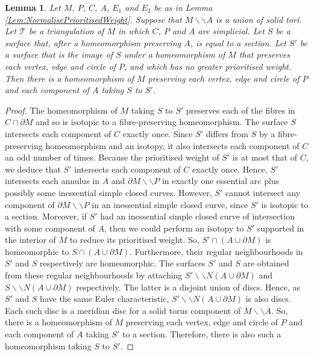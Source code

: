 \documentclass[oneside]{amsart}
\numberwithin{equation}{section}
\theoremstyle{plain}
\newtheorem{lemma}[equation]{Lemma}
\theoremstyle{definition}
\newcommand{\cut}{\backslash\backslash}
\begin{document}
\begin{lemma}
\label{Lem:TwoEquivalences}
Let $M$, $P$, $C$, $A$, $E_1$ and $E_2$ be as in Lemma \ref{Lem:NormalisePrioritisedWeight}.
Suppose that $M \cut A$ is a union of solid tori.
Let $\mathcal{T}$ be a triangulation of $M$ in which $C$, $P$ and $A$ are simplicial. 
Let $S$ be a surface that, after a homeomorphism preserving $A$, is equal to a section.
Let $S'$ be a surface that is the image of $S$ under a homeomorphism of $M$ that preserves
each vertex, edge and circle of $P$, and which has no greater prioritised weight.
Then there is a homeomorphism of $M$ preserving each vertex, edge and circle of $P$ and each component of $A$ taking $S$ to $S'$.
\end{lemma}

\begin{proof}
The homeomorphism of $M$ taking $S$ to $S'$ preserves each of the fibres in $C \cap \partial M$
and so is isotopic to a fibre-preserving homeomorphism.
The surface $S$ intersects each component of $C$ exactly once. Since $S'$ differs from $S$ by a fibre-preserving homeomorphism and an isotopy,
it also intersects each component of $C$ an odd number of times. Because the prioritised weight
of $S'$ is at most that of $C$, we deduce that $S'$ intersects each component of $C$ exactly once.
Hence, $S'$ intersects each annulus in $A$ and $\partial M \cut P$ in exactly one essential arc plus
possibly some inessential simple closed curves. However, $S'$ cannot intersect any component of
$\partial M \cut P$ in an inessential simple closed curve, since $S'$ is isotopic to a section. 
Moreover, if $S'$ had an inessential simple closed curve of intersection with some component of $A$,
then we could perform an isotopy to $S'$ supported in the interior of $M$ to reduce its
prioritised weight. So, $S' \cap (A \cup \partial M)$ is homeomorphic to $S \cap (A \cup \partial M)$.
Furthermore, their regular neighbourhoods in $S'$ and $S$ respectively are homeomorphic.
The surfaces $S'$ and $S$ are obtained from these regular neighbourhoods by attaching $S' \cut 
N(A \cup \partial M)$ and $S \cut N(A \cup \partial M)$ respectively. The latter is a disjoint union of discs.
Hence, as $S'$ and $S$ have the same Euler characteristic,  $S' \cut 
N(A \cup \partial M)$ is also discs. Each such disc is a meridian disc for a solid torus component
of $M \cut A$. So, there is a homeomorphism of $M$ preserving each vertex, edge and circle of $P$ and each component of $A$ taking
$S'$ to a section. Therefore, there is also such a homeomorphism taking $S$ to $S'$.
\end{proof}
\end{document}
